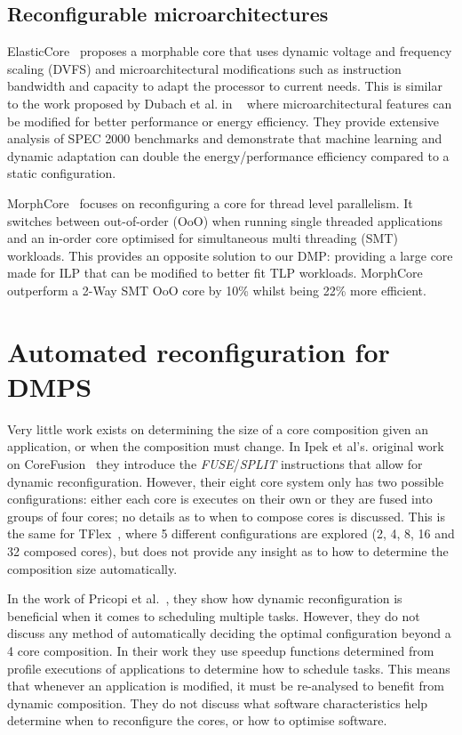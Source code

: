 \subsection{Reconfigurable microarchitectures}
ElasticCore~\cite{tavanaElastic} proposes a morphable core that uses dynamic voltage and frequency scaling (DVFS) and microarchitectural modifications such as instruction bandwidth and capacity to adapt the processor to current needs.
This is similar to the work proposed by Dubach et al. in ~\cite{dubach13dynamic} where microarchitectural features can be modified for better performance or energy efficiency.
They provide extensive analysis of SPEC 2000 benchmarks and demonstrate that machine learning and dynamic adaptation can double the energy/performance efficiency compared to a static configuration.

MorphCore~\cite{khubaibMorphCore2012} focuses on reconfiguring a core for thread level parallelism.
It switches between out-of-order (OoO) when running single threaded applications and an in-order core optimised for simultaneous multi threading (SMT) workloads.
This provides an opposite solution to our DMP: providing a large core made for ILP that can be modified to better fit TLP workloads.
MorphCore outperform a 2-Way SMT OoO core by 10\% whilst being 22\% more efficient.


\section{Automated reconfiguration for DMPS}

Very little work exists on determining the size of a core composition given an application, or when the composition must change.
In Ipek et al's. original work on CoreFusion~\cite{ipek2007CoreFusion} they introduce the \textit{FUSE}/\textit{SPLIT} instructions that allow for dynamic reconfiguration.
However, their eight core system only has two possible configurations: either each core is executes on their own or they are fused into groups of four cores; no details as to when to compose cores is discussed.
This is the same for TFlex~\cite{kim2007tflex}, where 5 different configurations are explored (2, 4, 8, 16 and 32 composed cores), but does not provide any insight as to how to determine the composition size automatically.

In the work of Pricopi et al.~\cite{pricopiSchedCoreComp2014}, they show how dynamic reconfiguration is beneficial when it comes to scheduling multiple tasks.
However, they do not discuss any method of automatically deciding the optimal configuration beyond a 4 core composition.
In their work they use speedup functions determined from profile executions of applications to determine how to schedule tasks.
This means that whenever an application is modified, it must be re-analysed to benefit from dynamic composition.
They do not discuss what software characteristics help determine when to reconfigure the cores, or how to optimise software.

